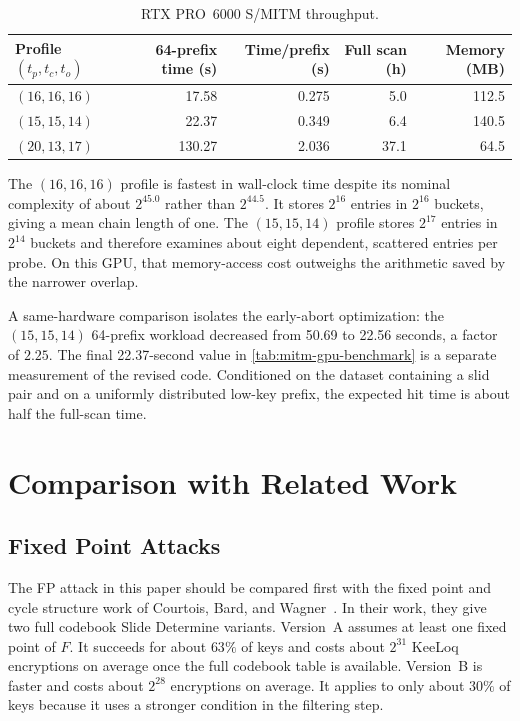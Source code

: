 \documentclass[version=preprint]{iacrcc}
\begin{document}
\begin{table}[htbp]
  \centering
  \caption{RTX PRO~6000 S/MITM throughput.}
  \label{tab:mitm-gpu-benchmark}
  \setlength{\tabcolsep}{5pt}
  \begin{tabular}{@{}lrrrr@{}}
    \toprule
    Profile $(t_p,t_c,t_o)$ & 64-prefix time (s) & Time/prefix (s) & Full scan (h) & Memory (MB) \\
    \midrule
    $(16,16,16)$ & 17.58 & 0.275 & 5.0 & 112.5 \\
    $(15,15,14)$ & 22.37 & 0.349 & 6.4 & 140.5 \\
    $(20,13,17)$ & 130.27 & 2.036 & 37.1 & 64.5 \\
    \bottomrule
  \end{tabular}
\end{table}

The $(16,16,16)$ profile is fastest in wall-clock time despite its nominal complexity of about $2^{45.0}$ rather than $2^{44.5}$.
It stores $2^{16}$ entries in $2^{16}$ buckets, giving a mean chain length of one.
The $(15,15,14)$ profile stores $2^{17}$ entries in $2^{14}$ buckets and therefore examines about eight dependent, scattered entries per probe.
On this GPU, that memory-access cost outweighs the arithmetic saved by the narrower overlap.

A same-hardware comparison isolates the early-abort optimization: the $(15,15,14)$ 64-prefix workload decreased from 50.69 to 22.56 seconds, a factor of $2.25$.
The final 22.37-second value in \autoref{tab:mitm-gpu-benchmark} is a separate measurement of the revised code.
Conditioned on the dataset containing a slid pair and on a uniformly distributed low-key prefix, the expected hit time is about half the full-scan time.

\section{Comparison with Related Work}\label{sec:comparison}

\subsection{Fixed Point Attacks}

The FP attack in this paper should be compared first with the fixed point and cycle structure work of Courtois, Bard, and Wagner~\cite{courtois2007algebraic}.
In their work, they give two full codebook Slide Determine variants.
Version~A assumes at least one fixed point of $F$.
It succeeds for about $63\%$ of keys and costs about $2^{31}$ KeeLoq encryptions on average once the full codebook table is available.
Version~B is faster and costs about $2^{28}$ encryptions on average.
It applies to only about $30\%$ of keys because it uses a stronger condition in the filtering step.
\end{document}
